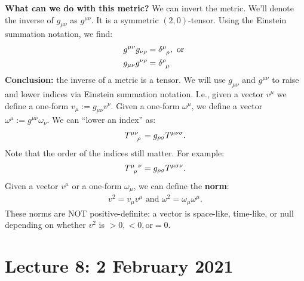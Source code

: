 \documentclass[11pt]{article}
\newcommand{\grmetric}[0]{g_{\mu \nu}}
\theoremstyle{definition}
\begin{document}
\newline
\newline
\textbf{What can we do with this metric?}
\newline 
We can invert the metric. We'll denote the inverse of \( \grmetric \) as \( g^{\mu \nu} \). It is a symmetric \( (2,0)\)-tensor. Using the Einstein summation notation, we find: 
\begin{align*}
	g^{\mu \nu} g_{\nu \rho} & = \tensor{\delta}{^\mu_\rho}, \text{ or } \\
	g_{\mu \nu} g^{\nu \rho} & = \tensor{\delta}{^\rho_\mu} 
\end{align*}
\textbf{Conclusion:} the inverse of a metric is a tensor. We will use \( \grmetric \) and \( g^{\mu \nu} \) to raise and lower indices via Einstein summation notation. I.e., given a vector \( v^\mu \) we define a one-form \( v_\mu := \grmetric v^\nu \). Given a one-form \( \omega^\mu \), we define a vector \( \omega^\mu := g^{\mu \nu} \omega_\nu \). We can ``lower an index'' as:
\begin{align*}
	\tensor{T}{^{\mu \nu}_\rho} = g_{\rho \sigma} \tensor{T}{^{\mu \nu \sigma}}.
\end{align*}
Note that the order of the indices still matter. For example: 
\begin{align*}
	\tensor{T}{^{\mu}_{\rho}^{\nu}} = g_{\rho \sigma} \tensor{T}{^{\mu \sigma \nu}}.
\end{align*}
Given a vector \( v^\mu \) or a one-form \( \omega_\mu \), we can define the \textbf{norm}: 
\begin{align*}
	v^2 = v_\mu v^\mu \text{ and } \omega^2 = \omega_\mu \omega^\mu. 
\end{align*}
These norms are NOT positive-definite: a vector is space-like, time-like, or null depending on whether \( v^2 \) is \( > 0, < 0, \text{or} = 0 \). 


\section{Lecture 8: 2 February 2021}
\end{document}

